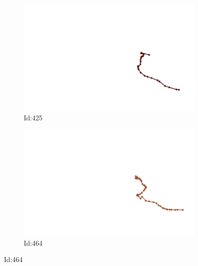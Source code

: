 \documentclass[12pt,twoside]{report}
\begin{document}
\begin{figure}
\centering
\begin{subfigure}[b]{0.20\textwidth}
\centering
\includegraphics[width=\textwidth]{../../trajectories/425.png}
\caption{Id:425}
\end{subfigure}
\begin{subfigure}[b]{0.20\textwidth}
\centering
\includegraphics[width=\textwidth]{../../trajectories/464.png}
\caption{Id:464}
\end{subfigure}
\end{figure}
\end{document}
